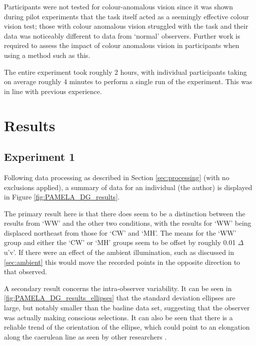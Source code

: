 Participants were not tested for colour-anomalous vision since it was shown during pilot experiments that the task itself acted as a seemingly effective colour vision test; those with colour anomalous vision struggled with the task and their data was noticeably different to data from `normal' observers. Further work is required to assess the impact of colour anomalous vision in participants when using a method such as this. 

The entire experiment took roughly 2 hours, with individual participants taking on average roughly 4 minutes to perform a single run of the experiment. This was in line with previous experience.


\section{Results}

\subsection{Experiment 1}

Following data processing as described in Section \ref{sec:processing} (with no exclusions applied), a summary of data for an individual (the author) is displayed in Figure \ref{fig:PAMELA_DG_results}. 

The primary result here is that there does seem to be a distinction between the results from `WW' and the other two conditions, with the results for `WW' being displaced northeast from those for `CW' and `MH'. The means for the `WW' group and either the `CW' or `MH' groups seem to be offset by roughly 0.01 $\Delta$u'v'. If there were an effect of the ambient illumination, such as discussed in \ref{sec:ambient} this would move the recorded points in the opposite direction to that observed.

A secondary result concerns the intra-observer variability. It can be seen in \ref{fig:PAMELA_DG_results_ellipses} that the standard deviation ellipses are large, but notably smaller than the basline data set, suggesting that the observer was actually making conscious selections. It can also be seen that there is a reliable trend of the orientation of the ellipse, which could point to an elongation along the caerulean line as seen by other researchers \citep{bosten_what_2015}.

